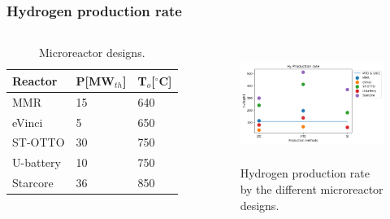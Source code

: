 \begin{frame}
\frametitle{Hydrogen production rate}
\begin{columns}
    \column[t]{5cm}
	\begin{table}[!htb]
		\centering
	    \caption{Microreactor designs.}
		\begin{tabular}{l|ll}
		\hline
		Reactor                                      & P[MW$_{th}$] & T$_o$[$^\circ$C] \\ \hline
		MMR \cite{usnc_mmr_2019}  		             & 15           & 640              \\
		eVinci \cite{hernandez_micro_2019}           & 5            & 650              \\
		ST-OTTO \cite{harlan_x-energy_2018}          & 30           & 750              \\
		U-battery \cite{ding_design_2011}            & 10           & 750              \\
		Starcore \cite{star_core_nuclear_star_2015}  & 36           & 850              \\ \hline
        \end{tabular}
	\end{table}

	\column[t]{6.5cm}
	\begin{figure}[htbp!]
		\begin{center}
			\includegraphics[height=3.8cm]{images/reactors-by-hour1}
		\end{center}
		\caption{Hydrogen production rate by the different microreactor designs.}
	\end{figure}

\end{columns}
\end{frame}

